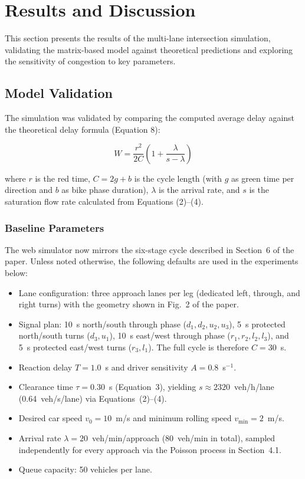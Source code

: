 \section{Results and Discussion}

This section presents the results of the multi-lane intersection simulation, validating the matrix-based model against theoretical predictions and exploring the sensitivity of congestion to key parameters.

\subsection{Model Validation}

The simulation was validated by comparing the computed average delay against the theoretical delay formula (Equation 8):

\begin{equation}
W = \frac{r^2}{2C}\left(1 + \frac{\lambda}{s - \lambda}\right)
\end{equation}

where $r$ is the red time, $C = 2g + b$ is the cycle length (with $g$ as green time per direction and $b$ as bike phase duration), $\lambda$ is the arrival rate, and $s$ is the saturation flow rate calculated from Equations (2)--(4).

\subsubsection{Baseline Parameters}

The web simulator now mirrors the six-stage cycle described in Section~6 of the paper. Unless noted otherwise, the following defaults are used in the experiments below:
\begin{itemize}
    \item Lane configuration: three approach lanes per leg (dedicated left, through, and right turns) with the geometry shown in Fig.~2 of the paper.
    \item Signal plan: 10~s north/south through phase ($d_1,d_2,u_2,u_3$), 5~s protected north/south turns ($d_3,u_1$), 10~s east/west through phase ($r_1,r_2,l_2,l_3$), and 5~s protected east/west turns ($r_3,l_1$). The full cycle is therefore $C = 30$~s.
    \item Reaction delay $T = 1.0$~s and driver sensitivity $A = 0.8$~s$^{-1}$.
    \item Clearance time $\tau = 0.30$~s (Equation~3), yielding $s \approx 2320$~veh/h/lane (0.64~veh/s/lane) via Equations~(2)--(4).
    \item Desired car speed $v_0 = 10$~m/s and minimum rolling speed $v_{\min}=2$~m/s.
    \item Arrival rate $\lambda = 20$~veh/min/approach (80~veh/min in total), sampled independently for every approach via the Poisson process in Section~4.1.
    \item Queue capacity: 50 vehicles per lane.
\end{itemize}


